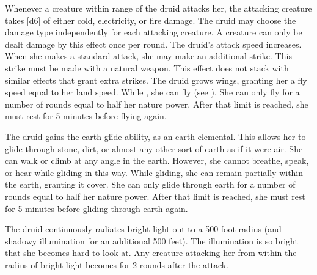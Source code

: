         Whenever a creature within \rngmed range of the druid attacks her, the attacking creature takes \spelldamage{}[d6] of either cold, electricity, or fire damage.
        The druid may choose the damage type independently for each attacking creature.
        A creature can only be dealt damage by this effect once per round.
        The druid's attack speed increases.
        When she makes a standard attack, she may make an additional strike.
        This strike must be made with a natural weapon.
        This effect does not stack with similar effects that grant extra strikes.
        The druid grows wings, granting her a fly speed equal to her land speed.
        While \unencumbered, she can fly (see ).
        She can only fly for a number of rounds equal to half her nature power.
        After that limit is reached, she must rest for 5 minutes before flying again.

        The druid gains the earth glide ability, as an earth elemental.
        This allows her to glide through stone, dirt, or almost any other sort of earth as if it were air.
        She can walk or climb at any angle in the earth.
        However, she cannot breathe, speak, or hear while gliding in this way.
        While gliding, she can remain partially within the earth, granting it cover.
        She can only glide through earth for a number of rounds equal to half her nature power.
        After that limit is reached, she must rest for 5 minutes before gliding through earth again.

        The druid continuously radiates bright light out to a 500 foot radius (and shadowy illumination for an additional 500 feet).
        The illumination is so bright that she becomes hard to look at.
        Any creature attacking her from within the radius of bright light becomes \partiallyblinded for 2 rounds after the attack.

